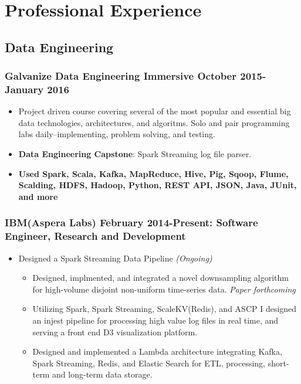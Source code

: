 \documentclass[a4paper,10pt,notitlepage]{article}
\begin{document}
\vspace{-10pt}\section*{Professional Experience}
\subsection*{Data Engineering}
\subsubsection*{Galvanize Data Engineering Immersive October 2015-January 2016}
	\begin{itemize}
		\vspace{-5pt} \item Project driven course covering several of the most popular and essential big data technologies, architectures, and algoritms. Solo and pair programming labs daily--implementing, problem solving, and testing.
		\vspace{-5pt} \item \textbf{Data Engineering Capstone}: Spark Streaming log file parser.
		\vspace{-5pt}\item 	\textbf{Used Spark, Scala, Kafka, MapReduce, Hive, Pig, Sqoop, Flume, Scalding, HDFS, Hadoop, Python, REST API, JSON, Java, JUnit, and more}
	\end{itemize}
	\subsubsection*{IBM(Aspera Labs) February 2014-Present: Software Engineer, Research and Development}
	\begin{itemize}
	\vspace{-5pt}\item 	Designed a Spark Streaming Data Pipeline \textit{(Ongoing)} \begin{itemize}
					\item 	Designed, implmented, and integrated a novel downsampling algorithm for high-volume disjoint non-uniform time-series data. \textit{Paper forthcoming}
					\item 	Utilizing Spark, Spark Streaming, ScaleKV(Redis), and ASCP I designed an injest pipeline for processing high value log files in real time, and serving a front end D3 visualization platform.
					\item 	Designed and implemented a Lambda architecture integrating Kafka, Spark Streaming, Redis, and Elastic Search for ETL, processing, short-term and long-term data storage.
					\end{itemize}
	\end{itemize}
\end{document}
